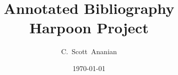 \documentclass[10pt,notitlepage]{article}
\author{C.~Scott~Ananian}
\title{Annotated Bibliography \\ \Large Harpoon Project}
\date{\today}
\begin{document}

\maketitle
\nocite{*}

\end{document}
